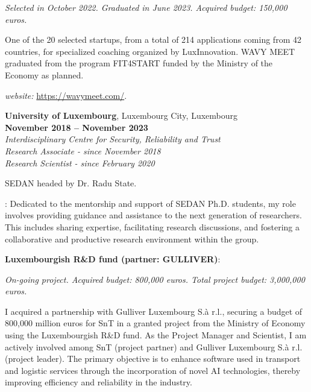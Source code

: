 \documentclass[margin,line]{resume}
\begin{document}
\begin{resume}
\begin{list2}
	\emph{Selected in October 2022. Graduated in June 2023. Acquired budget: 150,000 euros.}
	
	One of the 20 selected startups, from a total of 214 applications coming from 42 countries, for specialized coaching organized by LuxInnovation. WAVY MEET graduated from the program FIT4START funded by the Ministry of the Economy as planned.
	
	\item \filbreak\textit{website:} \url{https://wavymeet.com/}.
\end{list2}


\textbf{University of Luxembourg}, Luxembourg City, Luxembourg\\  \phantom{.} \hfill \textbf{November 2018 -- November 2023}\\
\textit{Interdisciplinary Centre for Security, Reliability and Trust}\hfill\\
\textit{Research Associate - since November 2018}\hfill\\
\textit{Research Scientist - since February 2020}\hfill  
\vspace{-3mm}\\\vspace{-1mm}
\begin{list2}
	\item {} SEDAN headed by Dr. Radu State.
	\item {}: Dedicated to the mentorship and support of SEDAN Ph.D. students, my role involves providing guidance and assistance to the next generation of researchers. This includes sharing expertise, facilitating research discussions, and fostering a collaborative and productive research environment within the group. 
	\item \filbreak\textbf{Luxembourgish R\&D fund (partner: GULLIVER)}: 
	
	\emph{On-going project. Acquired budget: 800,000 euros. Total project budget: 3,000,000 euros.}
	
	I acquired a partnership with Gulliver Luxembourg S.à r.l., securing a budget of 800,000 million euros for SnT in a granted project from the Ministry of Economy using the Luxembourgish R\&D fund. As the Project Manager and Scientist, I am actively involved among SnT (project partner) and Gulliver Luxembourg S.à r.l. (project leader). The primary objective is to enhance software used in transport and logistic services through the incorporation of novel AI technologies, thereby improving efficiency and reliability in the industry.


\end{list2}
\end{resume}
\end{document}
